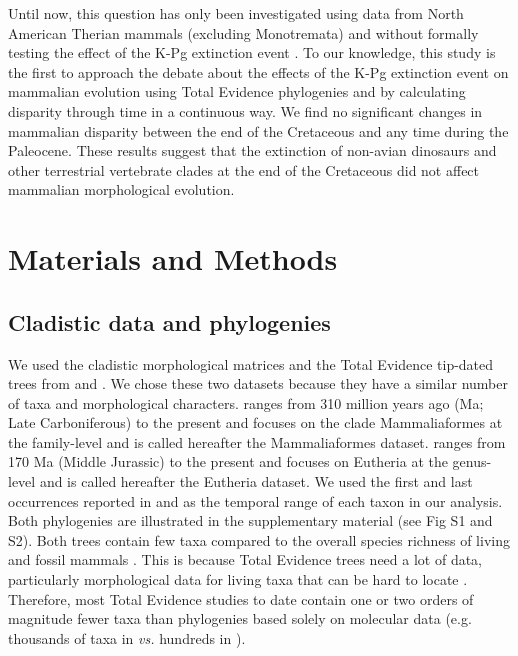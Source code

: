 \documentclass[10pt,letterpaper]{article}
\begin{document}
Until now, this question has only been investigated using data from North American Therian mammals (excluding Monotremata) and without formally testing the effect of the K-Pg extinction event \citep{Wilson2013}.
To our knowledge, this study is the first to approach the debate about the effects of the K-Pg extinction event on mammalian evolution using Total Evidence phylogenies and by calculating disparity through time in a continuous way.
We find no significant changes in mammalian disparity between the end of the Cretaceous and any time during the Paleocene. 
These results suggest that the extinction of non-avian dinosaurs and other terrestrial vertebrate clades at the end of the Cretaceous did not affect mammalian morphological evolution.

\section*{Materials and Methods}
\subsection{Cladistic data and phylogenies}
We used the cladistic morphological matrices and the Total Evidence tip-dated trees \citep{ronquista2012} from \citet[][103 taxa with 446 morphological characters;]{Slater2012MEE} and \citet[][102 taxa with 421 morphological characters]{beckancient2014}.
We chose these two datasets because they have a similar number of taxa and morphological characters.
\cite{Slater2012MEE} ranges from 310 million years ago (Ma; Late Carboniferous) to the present and focuses on the clade Mammaliaformes at the family-level and is called hereafter the Mammaliaformes dataset.
\cite{beckancient2014} ranges from 170 Ma (Middle Jurassic) to the present and focuses on Eutheria at the genus-level and is called hereafter the Eutheria dataset.
We used the first and last occurrences reported in \cite{Slater2012MEE} and \cite{beckancient2014} as the temporal range of each taxon in our analysis.
Both phylogenies are illustrated in the supplementary material (see Fig S1 and S2).
Both trees contain few taxa compared to the overall species richness of living and fossil mammals \citep{bininda2007delayed,archibald2011extinction}.
This is because Total Evidence trees need a lot of data, particularly morphological data for living taxa that can be hard to locate \citep{GuillermeCooper}.
Therefore, most Total Evidence studies to date contain one or two orders of magnitude fewer taxa than phylogenies based solely on molecular data (e.g. thousands of taxa in \citealt{bininda2007delayed,meredithimpacts2011} \textit{vs.} hundreds in \citealt{ronquista2012,Slater2012MEE,Wood01032013,beckancient2014}).
\end{document}
